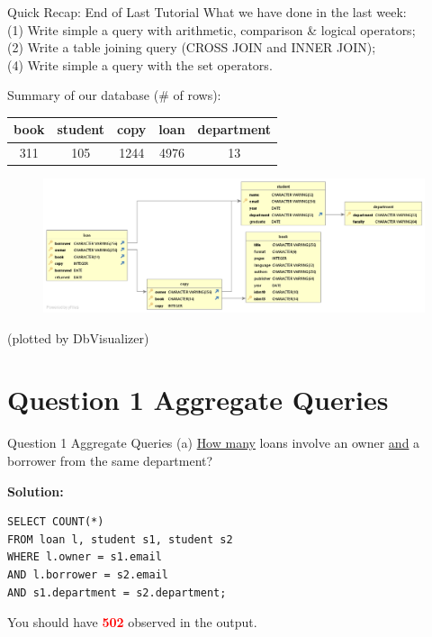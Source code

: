 \begin{frame}[fragile]{Quick Recap: End of Last Tutorial}
	What we have done in the last week:\\\vspace{5pt}
	(1) Write simple a query with arithmetic, comparison \& logical operators;\\
	(2) Write a table joining query (CROSS JOIN and INNER JOIN);\\
	(4) Write simple a query with the set operators.\\\vspace{5pt}
	
	Summary of our database (\# of rows):\\\vspace{5pt}
	\centering
	\begin{tabular}{|c|c|c|c|c|} \hline
		\textbf{book} & \textbf{student} & \textbf{copy} & \textbf{loan} & \textbf{department}\\ \hline
		311 & 105 & 1244 & 4976 & 13 \\ \hline
	\end{tabular}
	
	\begin{figure}
		\includegraphics[width=1\textwidth]{t1/images/t1-end.png}
	\end{figure}\vspace{-10pt}
	{\tiny(plotted by DbVisualizer)}
\end{frame}

\section*{Question 1 Aggregate Queries}

\begin{frame}[fragile]{Question 1 Aggregate Queries (a)}
\underline{How many} loans involve an owner \underline{and} a borrower from the same department?\\ \vspace{10pt}

\textbf{Solution:}\\
\begin{lstlisting}
SELECT COUNT(*)
FROM loan l, student s1, student s2
WHERE l.owner = s1.email 
AND l.borrower = s2.email
AND s1.department = s2.department;
\end{lstlisting}
\vspace{10pt}
You should have \textcolor{red}{\textbf{502}} observed in the output. 
\end{frame}


